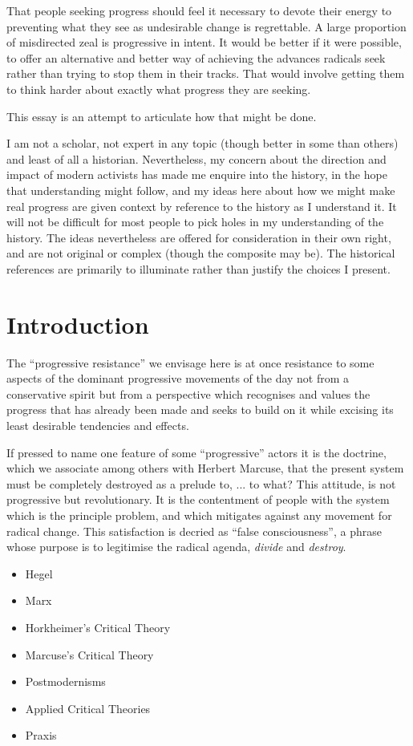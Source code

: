 \documentclass[10pt,titlepage]{book}
\begin{document}
That people seeking progress should feel it necessary to devote their energy to preventing what they see as undesirable change is regrettable.
A large proportion of misdirected zeal is progressive in intent.
It would be better if it were possible, to offer an alternative and better way of achieving the advances radicals seek rather than trying to stop them in their tracks.
That would involve getting them to think harder about exactly what progress they are seeking.

This essay is an attempt to articulate how that might be done.

I am not a scholar, not expert in any topic (though better in some than others) and least of all a historian.
Nevertheless, my concern about the direction and impact of modern activists has made me enquire into the history, in the hope that understanding might follow, and my ideas here about how we might make real progress are given context by reference to the history as I understand it.
It will not be difficult for most people to pick holes in my understanding of the history.
The ideas nevertheless are offered for consideration in their own right, and are not original or complex (though the composite may be).
The historical references are primarily to illuminate rather than justify the choices I present.


\section{Introduction}

The ``progressive resistance'' we envisage here is at once resistance to some aspects of the dominant progressive movements of the day not from a conservative spirit but from a perspective which recognises and values the progress that has already been made and seeks to build on it while excising its least desirable tendencies and effects.

If pressed to name one feature of some ``progressive'' actors it is the doctrine, which we associate among others with Herbert Marcuse, that the present system must be completely destroyed as a prelude to, ... to what?
This attitude, is not progressive but revolutionary.
It is the contentment of people with the system which is the principle problem, and which mitigates against any movement for radical change.
This satisfaction is decried as ``false consciousness'', a phrase whose purpose is to legitimise the radical agenda, \emph{divide} and \emph{destroy}.

\begin{itemize}
\item Hegel
\item Marx
\item Horkheimer's Critical Theory
\item Marcuse's Critical Theory
\item Postmodernisms
\item Applied Critical Theories
\item Praxis
\end{itemize}
\end{document}
